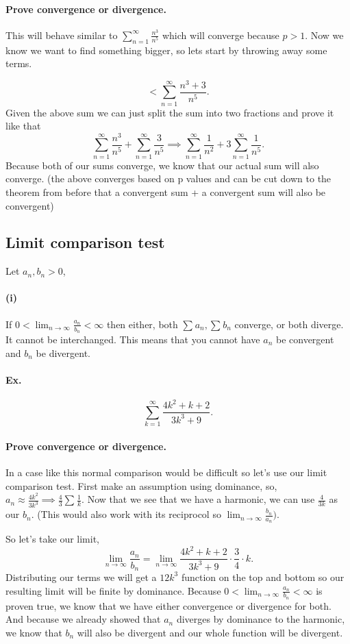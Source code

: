 \paragraph{Prove convergence or divergence. \\}
This will behave similar to $ \sum_{ n=1 } ^{ \infty } \frac{ n^3 }{ n^{ 5 } } $ which will converge because $ p>1 $. Now we know we want to find something bigger, so lets start by throwing away some terms. 

\[
<\sum_{ n=1 } ^{ \infty } \frac{ n^3+3 }{ n^{ 5 } }
.\] 
Given the above sum we can just split the sum into two fractions and prove it like that
\[
\sum_{ n=1 } ^{ \infty } \frac{ n^3 }{ n^{ 5 } } +\sum_{ n=1 } ^{ \infty } \frac{ 3 }{ n^{ 5 } } \implies \sum_{ n=1 } ^{ \infty } \frac{ 1 }{ n^2 } +3\sum_{ n=1 } ^{ \infty } \frac{ 1 }{ n^{ 5 } } 
.\] 
Because both of our sums converge, we know that our actual sum will also converge. (the above converges based on p values and can be cut down to the theorem from before that a convergent sum + a convergent sum will also be convergent) 
\subsection*{Limit comparison test}%
\label{sub:Limit comparison test}
Let $ a_n, b_n > 0 $,
\paragraph{(i)}
If $ 0<\lim_{ n \to \infty} \frac{ a_n }{ b_n }<\infty  $ then either, both $ \sum_{  } ^{  } a_n, \sum_{  } ^{  } b_n $ converge, or both diverge. It cannot be interchanged. This means that you cannot have $ a_n $ be convergent and $ b_n $ be divergent. 

\paragraph{Ex.}
\[
\sum_{ k=1 } ^{ \infty } \frac{ 4k^2+k+2 }{ 3k^3+9 }
.\] 
\paragraph{Prove convergence or divergence.\\}
In a case like this normal comparison would be difficult so let's use our limit comparison test. First make an assumption using dominance, so, $ a_n \approx \frac{ 4k^2 }{ 3k^3 } \implies \frac{ 4 }{ 3 } \sum_{  } ^{  } \frac{ 1 }{ k } $. Now that we see that we have a harmonic, we can use $ \frac{ 4 }{ 3k }  $ as our $ b_n $. (This would also work with its reciprocol so $ \lim_{ n \to \infty} \frac{ b_n }{ a_n } )$. 

So let's take our limit,
\[
\lim_{ n \to \infty} \frac{ a_n }{ b_n }=\lim_{ n \to \infty} \frac{ 4k^2+k+2 }{ 3k^3+9 }\cdot \frac{ 3 }{ 4 } \cdot k
.\] 
Distributing our terms we will get a $ 12k^3 $ function on the top and bottom so our resulting limit will be finite by dominance. Because $ 0<\lim_{ n \to \infty} \frac{ a_n }{ b_n }<\infty $ is proven true, we know that we have either convergence or divergence for both. And because we already showed that $ a_n $ diverges by dominance to the harmonic, we know that $ b_n $ will also be divergent and our whole function will be divergent. 
